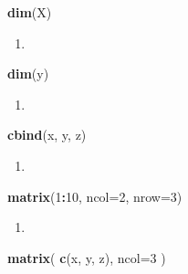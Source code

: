 \documentclass[]{book}
\newenvironment{Shaded}{\begin{snugshade}}{\end{snugshade}}
\newcommand{\DataTypeTok}[1]{\textcolor[rgb]{0.13,0.29,0.53}{#1}}
\newcommand{\DecValTok}[1]{\textcolor[rgb]{0.00,0.00,0.81}{#1}}
\newcommand{\KeywordTok}[1]{\textcolor[rgb]{0.13,0.29,0.53}{\textbf{#1}}}
\newcommand{\NormalTok}[1]{#1}
\newcommand{\OperatorTok}[1]{\textcolor[rgb]{0.81,0.36,0.00}{\textbf{#1}}}
\begin{document}
\begin{Shaded}
\begin{Highlighting}[]
\KeywordTok{dim}\NormalTok{(X)}
\end{Highlighting}
\end{Shaded}

\begin{enumerate}
\def\labelenumi{\arabic{enumi}.}
\setcounter{enumi}{2}
\item
\end{enumerate}

\begin{Shaded}
\begin{Highlighting}[]
\KeywordTok{dim}\NormalTok{(y)}
\end{Highlighting}
\end{Shaded}

\begin{enumerate}
\def\labelenumi{\arabic{enumi}.}
\setcounter{enumi}{3}
\item
\end{enumerate}

\begin{Shaded}
\begin{Highlighting}[]
\KeywordTok{cbind}\NormalTok{(x, y, z)}
\end{Highlighting}
\end{Shaded}

\begin{enumerate}
\def\labelenumi{\arabic{enumi}.}
\setcounter{enumi}{4}
\item
\end{enumerate}

\begin{Shaded}
\begin{Highlighting}[]
\KeywordTok{matrix}\NormalTok{(}\DecValTok{1}\OperatorTok{:}\DecValTok{10}\NormalTok{, }\DataTypeTok{ncol=}\DecValTok{2}\NormalTok{, }\DataTypeTok{nrow=}\DecValTok{3}\NormalTok{)}
\end{Highlighting}
\end{Shaded}

\begin{enumerate}
\def\labelenumi{\arabic{enumi}.}
\setcounter{enumi}{6}
\item
\end{enumerate}

\begin{Shaded}
\begin{Highlighting}[]
\KeywordTok{matrix}\NormalTok{( }\KeywordTok{c}\NormalTok{(x, y, z), }\DataTypeTok{ncol=}\DecValTok{3}\NormalTok{ )}
\end{Highlighting}
\end{Shaded}
\end{document}

